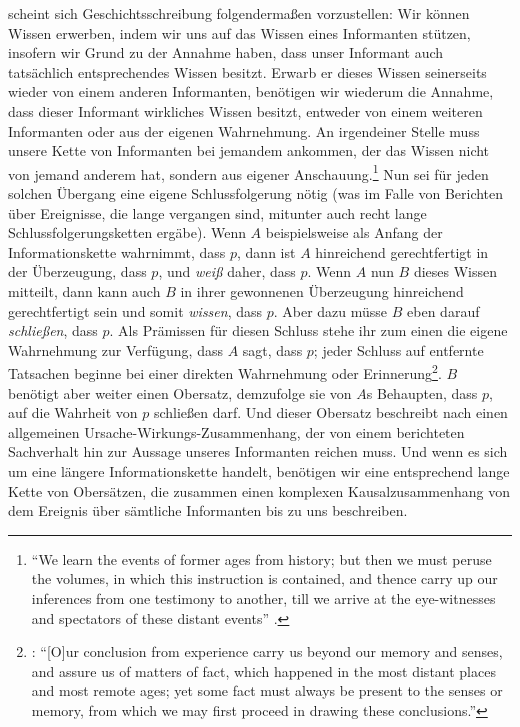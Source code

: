  scheint sich Geschichtsschreibung folgendermaßen
vorzustellen: Wir können Wissen erwerben, indem wir uns auf das Wissen eines
Informanten stützen, insofern wir Grund zu der Annahme haben, dass unser
Informant auch tatsächlich entsprechendes Wissen besitzt. Erwarb er dieses
Wissen seinerseits wieder von einem anderen Informanten, benötigen wir wiederum
die Annahme, dass dieser Informant wirkliches Wissen besitzt, entweder von einem
weiteren Informanten oder aus der eigenen Wahrnehmung. An irgendeiner Stelle
muss unsere Kette von Informanten bei jemandem ankommen, der das Wissen nicht
von jemand anderem hat, sondern aus eigener Anschauung.\footnote{\enquote{We learn the events of former ages from history; but then we must peruse the
  volumes, in which this instruction is contained, and thence carry up our
  inferences from one testimony to another, till we arrive at the eye-witnesses
  and spectators of these distant
  events} \parencite[][39]{Hume:AnEnquiryConcerningHumanUnderstanding1964}.} Nun sei für jeden
solchen Übergang eine eigene Schlussfolgerung nötig (was im Falle von Berichten
über Ereignisse, die lange vergangen sind, mitunter auch recht lange
Schlussfolgerungsketten ergäbe). Wenn $A$ beispielsweise als Anfang der
Informationskette wahrnimmt, dass $p$, dann ist $A$ hinreichend gerechtfertigt
in der Überzeugung, dass $p$, und \emph{weiß} daher, dass $p$. Wenn $A$ nun $B$
dieses Wissen mitteilt, dann kann auch $B$ in ihrer gewonnenen Überzeugung
hinreichend gerechtfertigt sein und somit \emph{wissen}, dass $p$. Aber dazu
müsse $B$ eben darauf \emph{schließen}, dass $p$. Als Prämissen für diesen
Schluss stehe ihr zum einen die eigene Wahrnehmung zur Verfügung, dass $A$ sagt,
dass $p$; jeder Schluss auf entfernte Tatsachen beginne bei einer direkten
Wahrnehmung oder
Erinnerung\footnote{\cite[Vgl.][39]{Hume:AnEnquiryConcerningHumanUnderstanding1964}:
\enquote{[O]ur conclusion from experience carry us beyond our memory and senses,
and assure us of matters of fact, which happened in the most distant places and
most remote ages; yet some fact must always be present to the senses or memory,
from which we may first proceed in drawing these conclusions.}}.
$B$ benötigt aber weiter einen Obersatz, demzufolge sie von $A$s Behaupten, dass
$p$, auf die Wahrheit von $p$ schließen darf. Und dieser Obersatz beschreibt
nach  einen allgemeinen Ursache-Wirkungs-Zusammenhang, der
von einem berichteten Sachverhalt hin zur Aussage unseres Informanten reichen
muss. Und wenn es sich um eine längere Informationskette handelt, benötigen wir
eine entsprechend lange Kette von Obersätzen, die zusammen einen komplexen
Kausalzusammenhang von dem Ereignis über sämtliche Informanten bis zu uns
beschreiben.


